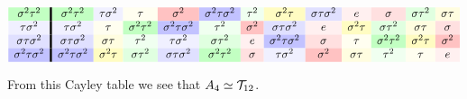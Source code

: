 \documentclass{ximera}
\begin{document}
\begin{example}
\begin{gather*}
\begin{array}{c!{\vline width 2pt}cccccccccccc}
      \sigma^2\tau^2\cellcolor{green!24!white}  & \sigma^2\tau^2\cellcolor{green!24!white}& \tau\sigma^2 \cellcolor{blue!6!white} & \tau\cellcolor{yellow!6!white} & \sigma^2\cellcolor{red!24!white}&  \sigma^2\tau\sigma^2 \cellcolor{blue!24!white}  &  \tau^2 \cellcolor{green!6!white} &  \sigma^2\tau \cellcolor{yellow!24!white}  & \sigma\tau\sigma^2 \cellcolor{blue!12!white}  & e \cellcolor{red!6!white}   & \sigma\cellcolor{red!12!white} &  \sigma\tau^2 \cellcolor{green!12!white}  & \sigma\tau \cellcolor{yellow!12!white}\\
      \tau\sigma^2\cellcolor{blue!6!white}      & \tau\sigma^2\cellcolor{blue!6!white} & \tau\cellcolor{yellow!6!white} & \sigma^2\tau^2 \cellcolor{green!24!white} & \sigma^2\tau\sigma^2\cellcolor{blue!24!white}& \tau^2\cellcolor{green!6!white}& \sigma^2\cellcolor{red!24!white} & \sigma\tau\sigma^2\cellcolor{blue!12!white} & e\cellcolor{red!6!white}  &  \sigma^2\tau \cellcolor{yellow!24!white}  & \sigma\tau^2 \cellcolor{green!12!white}  & \sigma\tau \cellcolor{yellow!12!white}  & \sigma \cellcolor{red!12!white}\\
      \sigma\tau\sigma^2\cellcolor{blue!12!white}    & \sigma\tau\sigma^2\cellcolor{blue!12!white} & \sigma\tau\cellcolor{yellow!12!white} & \tau^2\cellcolor{green!6!white} & \tau\sigma^2\cellcolor{blue!6!white} & \sigma\tau^2\cellcolor{green!12!white}& e\cellcolor{red!6!white} & \sigma^2\tau\sigma^2\cellcolor{blue!24!white} & \sigma\cellcolor{red!12!white}  &  \tau \cellcolor{yellow!6!white}  & \sigma^2\tau^2 \cellcolor{green!24!white}  &  \sigma^2\tau \cellcolor{yellow!24!white}  & \sigma^2 \cellcolor{red!24!white}\\
      \sigma^2\tau\sigma^2\cellcolor{blue!24!white}  & \sigma^2\tau\sigma^2\cellcolor{blue!24!white}& \sigma^2\tau\cellcolor{yellow!24!white} & \sigma\tau^2\cellcolor{green!12!white} & \sigma\tau\sigma^2\cellcolor{blue!12!white} & \sigma^2\tau^2\cellcolor{green!24!white}& \sigma\cellcolor{red!12!white} & \tau\sigma^2\cellcolor{blue!6!white} & \sigma^2\cellcolor{red!24!white}  &  \sigma\tau \cellcolor{yellow!12!white}  & \tau^2 \cellcolor{green!6!white}  &  \tau \cellcolor{yellow!6!white}  & e \cellcolor{red!6!white}\\
    \end{array}
    \end{gather*}

From this Cayley table we see that $A_4\simeq \mathcal{T}_{12}$.
  
  
\end{example}
\end{document}
